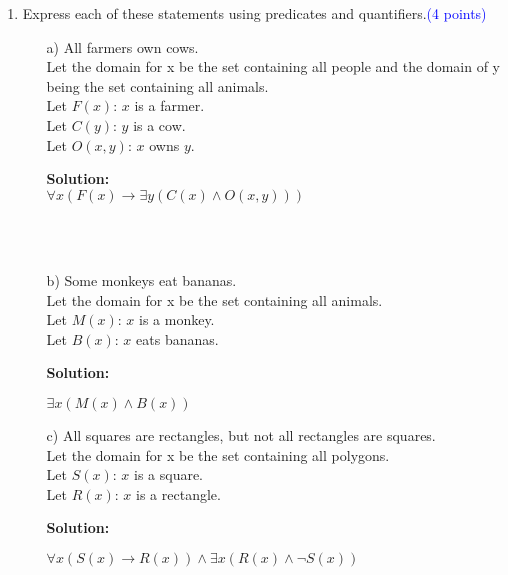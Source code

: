 \documentclass{article}
\newcommand{\pt}[1]{\textcolor{blue}{(#1 points)}}
\newenvironment{solution}
{
\par
\color{blue}
\textbf{Solution:}
}
{
\par
}
\begin{document}
\begin{enumerate}
    \item Express each of these statements using predicates and quantifiers.\pt{4}
    \begin{enumerate}
        \item[a)] All farmers own cows.\\

        Let the domain for x be the set containing all people and the domain of y being the set containing all animals.\\
        Let $F(x)$: $x$ is a farmer.\\
        Let $C(y)$: $y$ is a cow.\\
        Let $O(x, y)$: $x$ owns $y$.\\
        \begin{solution} \\
        $\forall x(F(x) \rightarrow \exists y (C(x) \land O(x, y)))$
        \end{solution}
        
        \\\\

        
        \item[b)] Some monkeys eat bananas.\\

        Let the domain for x be the set containing all animals.\\
        Let $M(x)$: $x$ is a monkey.\\
        Let $B(x)$: $x$ eats bananas.\\
        
        \begin{solution}
        $\exists x (M(x) \land B(x))$
        \end{solution}
        
        \item[c)] All squares are rectangles, but not all rectangles are squares.\\
        
        Let the domain for x be the set containing all polygons.\\
        Let $S(x)$: $x$ is a square.\\
        Let $R(x)$: $x$ is a rectangle.\\
        
        \begin{solution}
        $\forall x (S(x) \rightarrow R(x)) \land \exists x(R(x) \land \lnot S(x))$
        \end{solution}


\end{enumerate}
\end{enumerate}
\end{document}
